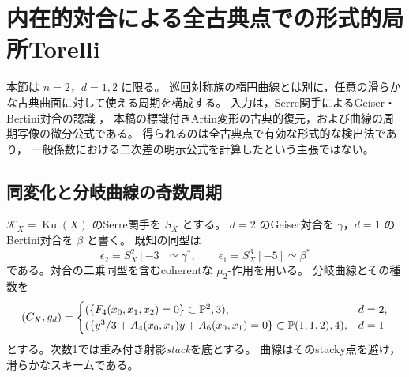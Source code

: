 \section{内在的対合による全古典点での形式的局所Torelli}
\label{sec:kuznetsov-intrinsic-period}

本節は $n=2$，$d=1,2$ に限る。
巡回対称族の楕円曲線とは別に，任意の滑らかな古典曲面に対して使える周期を構成する。
入力は，Serre関手によるGeiser・Bertini対合の認識
\cite[Proposition~4.1]{LinRampazzoZhang2026}，
本稿の標識付きArtin変形の古典的復元，および曲線の周期写像の微分公式である。
得られるのは全古典点で有効な形式的な検出法であり，
一般係数における二次差の明示公式を計算したという主張ではない。

\subsection{同変化と分岐曲線の奇数周期}

$\mathcal K_X=\operatorname{Ku}(X)$ のSerre関手を $S_X$ とする。
$d=2$ のGeiser対合を $\gamma$，$d=1$ のBertini対合を $\beta$ と書く。
既知の同型は
\begin{equation}\label{eq:ku-intrinsic-involutions}
 \epsilon_2=S_X^2[-3]\simeq\gamma^*,\qquad
 \epsilon_1=S_X^3[-5]\simeq\beta^*
\end{equation}
である。対合の二乗同型を含むcoherentな $\mu_2$-作用を用いる。
分岐曲線とその種数を
\[
 (C_X,g_d)=
 \begin{cases}
  (\{F_4(x_0,x_1,x_2)=0\}\subset\mathbb P^2,3),&d=2,\\
  (\{y^3/3+A_4(x_0,x_1)y+A_6(x_0,x_1)=0\}
    \subset\mathbb P(1,1,2),4),&d=1
 \end{cases}
\]
とする。次数1では重み付き射影\emph{stack}を底とする。
曲線はそのstacky点を避け，滑らかなスキームである。

